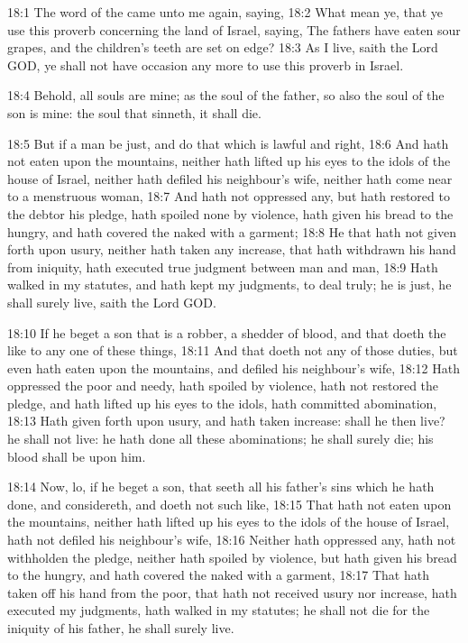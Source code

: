 18:1 The word of the \LORD came unto me again, saying, 18:2 What mean ye, that ye use this proverb concerning the land of Israel, saying, The fathers have eaten sour grapes, and the children's teeth are set on edge?  18:3 As I live, saith the Lord GOD, ye shall not have occasion any more to use this proverb in Israel.

18:4 Behold, all souls are mine; as the soul of the father, so also the soul of the son is mine: the soul that sinneth, it shall die.

18:5 But if a man be just, and do that which is lawful and right, 18:6 And hath not eaten upon the mountains, neither hath lifted up his eyes to the idols of the house of Israel, neither hath defiled his neighbour's wife, neither hath come near to a menstruous woman, 18:7 And hath not oppressed any, but hath restored to the debtor his pledge, hath spoiled none by violence, hath given his bread to the hungry, and hath covered the naked with a garment; 18:8 He that hath not given forth upon usury, neither hath taken any increase, that hath withdrawn his hand from iniquity, hath executed true judgment between man and man, 18:9 Hath walked in my statutes, and hath kept my judgments, to deal truly; he is just, he shall surely live, saith the Lord GOD.

18:10 If he beget a son that is a robber, a shedder of blood, and that doeth the like to any one of these things, 18:11 And that doeth not any of those duties, but even hath eaten upon the mountains, and defiled his neighbour's wife, 18:12 Hath oppressed the poor and needy, hath spoiled by violence, hath not restored the pledge, and hath lifted up his eyes to the idols, hath committed abomination, 18:13 Hath given forth upon usury, and hath taken increase: shall he then live? he shall not live: he hath done all these abominations; he shall surely die; his blood shall be upon him.

18:14 Now, lo, if he beget a son, that seeth all his father's sins which he hath done, and considereth, and doeth not such like, 18:15 That hath not eaten upon the mountains, neither hath lifted up his eyes to the idols of the house of Israel, hath not defiled his neighbour's wife, 18:16 Neither hath oppressed any, hath not withholden the pledge, neither hath spoiled by violence, but hath given his bread to the hungry, and hath covered the naked with a garment, 18:17 That hath taken off his hand from the poor, that hath not received usury nor increase, hath executed my judgments, hath walked in my statutes; he shall not die for the iniquity of his father, he shall surely live.

